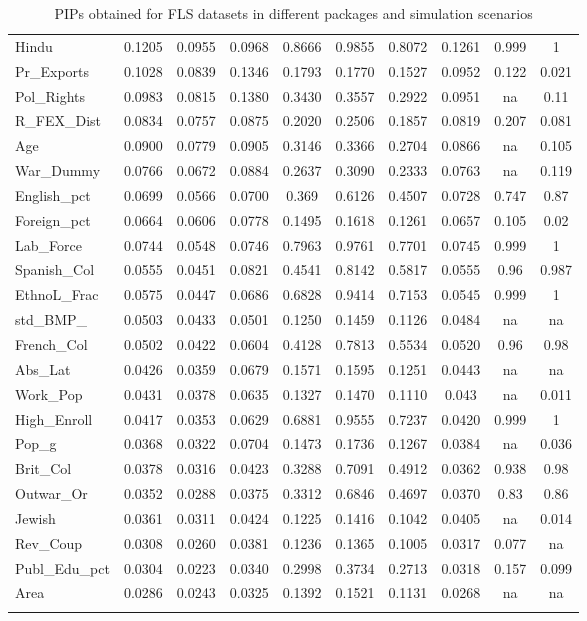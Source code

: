 \begin{landscape}
\begin{small}
\begin{longtable}{lccccccccc}
		Hindu	&	0.1205	&	0.0955	&	0.0968	&	0.8666	&	0.9855	&	0.8072	&	0.1261	&	0.999	&	1	\\
		Pr\_Exports	&	0.1028	&	0.0839	&	0.1346	&	0.1793	&	0.1770	&	0.1527	&	0.0952	&	0.122	&	0.021	\\
		Pol\_Rights	&	0.0983	&	0.0815	&	0.1380	&	0.3430	&	0.3557	&	0.2922	&	0.0951	&	na	&	0.11	\\
		R\_FEX\_Dist	&	0.0834	&	0.0757	&	0.0875	&	0.2020	&	0.2506	&	0.1857	&	0.0819	&	0.207	&	0.081	\\
		Age	&	0.0900	&	0.0779	&	0.0905	&	0.3146	&	0.3366	&	0.2704	&	0.0866	&	na	&	0.105	\\
		War\_Dummy	&	0.0766	&	0.0672	&	0.0884	&	0.2637	&	0.3090	&	0.2333	&	0.0763	&	na	&	0.119	\\
		English\_pct	&	0.0699	&	0.0566	&	0.0700	&	0.369	&	0.6126	&	0.4507	&	0.0728	&	0.747	&	0.87	\\
		Foreign\_pct	&	0.0664	&	0.0606	&	0.0778	&	0.1495	&	0.1618	&	0.1261	&	0.0657	&	0.105	&	0.02	\\
		Lab\_Force	&	0.0744	&	0.0548	&	0.0746	&	0.7963	&	0.9761	&	0.7701	&	0.0745	&	0.999	&	1	\\
		Spanish\_Col	&	0.0555	&	0.0451	&	0.0821	&	0.4541	&	0.8142	&	0.5817	&	0.0555	&	0.96	&	0.987	\\
		EthnoL\_Frac	&	0.0575	&	0.0447	&	0.0686	&	0.6828	&	0.9414	&	0.7153	&	0.0545	&	0.999	&	1	\\
		std\_BMP\_	&	0.0503	&	0.0433	&	0.0501	&	0.1250	&	0.1459	&	0.1126	&	0.0484	&	na	&	na	\\
		French\_Col	&	0.0502	&	0.0422	&	0.0604	&	0.4128	&	0.7813	&	0.5534	&	0.0520	&	0.96	&	0.98	\\
		Abs\_Lat	&	0.0426	&	0.0359	&	0.0679	&	0.1571	&	0.1595	&	0.1251	&	0.0443	&	na	&	na	\\
		Work\_Pop	&	0.0431	&	0.0378	&	0.0635	&	0.1327	&	0.1470	&	0.1110	&	0.043	&	na	&	0.011	\\
		High\_Enroll	&	0.0417	&	0.0353	&	0.0629	&	0.6881	&	0.9555	&	0.7237	&	0.0420	&	0.999	&	1	\\
		Pop\_g	&	0.0368	&	0.0322	&	0.0704	&	0.1473	&	0.1736	&	0.1267	&	0.0384	&	na	&	0.036	\\
		Brit\_Col	&	0.0378	&	0.0316	&	0.0423	&	0.3288	&	0.7091	&	0.4912	&	0.0362	&	0.938	&	0.98	\\
		Outwar\_Or	&	0.0352	&	0.0288	&	0.0375	&	0.3312	&	0.6846	&	0.4697	&	0.0370	&	0.83	&	0.86	\\
		Jewish	&	0.0361	&	0.0311	&	0.0424	&	0.1225	&	0.1416	&	0.1042	&	0.0405	&	na	&	0.014	\\
		Rev\_Coup	&	0.0308	&	0.0260	&	0.0381	&	0.1236	&	0.1365	&	0.1005	&	0.0317	&	0.077	&	na	\\
		Publ\_Edu\_pct	&	0.0304	&	0.0223	&	0.0340	&	0.2998	&	0.3734	&	0.2713	&	0.0318	&	0.157	&	0.099	\\
		Area	&	0.0286	&	0.0243	&	0.0325	&	0.1392	&	0.1521	&	0.1131	&	0.0268	&	na	&	na	\\\hline
		\caption{PIPs obtained for FLS datasets in different packages and simulation scenarios}
	\end{longtable}\end{small}
\end{landscape}
		


